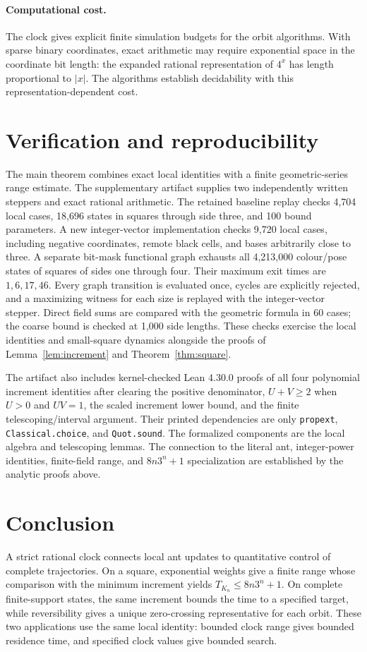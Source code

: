 \documentclass[11pt,a4paper]{article}
\theoremstyle{remark}\newtheorem{remark}[theorem]{Remark}
\begin{document}
\paragraph{Computational cost.}
The clock gives explicit finite simulation budgets for the orbit algorithms.
With sparse binary coordinates, exact arithmetic may require exponential
space in the coordinate bit length: the expanded rational representation of
$4^x$ has length proportional to $|x|$. The algorithms establish decidability
with this representation-dependent cost.

\section{Verification and reproducibility}
The main theorem combines exact local identities with a finite geometric-series
range estimate. The supplementary artifact supplies two independently written
steppers and exact rational arithmetic. The retained baseline replay checks
4,704 local cases, 18,696 states in squares through side three, and 100 bound
parameters. A new integer-vector implementation checks 9,720 local cases,
including negative coordinates, remote black cells, and bases arbitrarily close
to three. A separate bit-mask functional graph exhausts all 4,213,000
colour/pose states of squares of sides one through four. Their maximum exit
times are $1,6,17,46$. Every graph transition is evaluated once, cycles are
explicitly rejected, and a maximizing witness for each size is replayed with
the integer-vector stepper. Direct field sums are compared with the geometric
formula in 60 cases; the coarse bound is checked at 1,000 side lengths.
These checks exercise the local identities and small-square dynamics alongside
the proofs of Lemma~\ref{lem:increment} and Theorem~\ref{thm:square}.

The artifact also includes kernel-checked Lean 4.30.0 proofs of all four
polynomial increment identities after clearing the positive denominator,
$U+V\ge2$ when $U>0$ and $UV=1$, the scaled increment lower bound, and the
finite telescoping/interval argument. Their printed dependencies are only
\texttt{propext}, \texttt{Classical.choice}, and \texttt{Quot.sound}.
The formalized components are the local algebra and telescoping lemmas.
The connection to the literal ant, integer-power identities, finite-field
range, and $8n3^n+1$ specialization are established by the analytic proofs above.

\section{Conclusion}
A strict rational clock connects local ant updates to quantitative control of
complete trajectories. On a square, exponential weights give a finite range
whose comparison with the minimum increment yields $T_{K_n}\le8n3^n+1$.
On complete finite-support states, the same increment bounds the time to a
specified target, while reversibility gives a unique zero-crossing
representative for each orbit. These two applications use the same local
identity: bounded clock range gives bounded residence time, and specified
clock values give bounded search.
\end{document}
